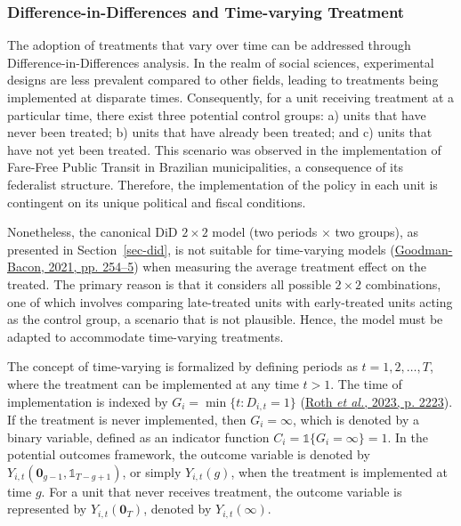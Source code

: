 \documentclass[12pt, a4paper, twoside]{article}
\numberwithin{equation}{subsection} %
\begin{document}
\hypertarget{sec-did-time-varying}{%
\subsubsection{Difference-in-Differences and Time-varying
Treatment}\label{sec-did-time-varying}}

The adoption of treatments that vary over time can be addressed through
Difference-in-Differences analysis. In the realm of social sciences,
experimental designs are less prevalent compared to other fields,
leading to treatments being implemented at disparate times.
Consequently, for a unit receiving treatment at a particular time, there
exist three potential control groups: a) units that have never been
treated; b) units that have already been treated; and c) units that have
not yet been treated. This scenario was observed in the implementation
of Fare-Free Public Transit in Brazilian municipalities, a consequence
of its federalist structure. Therefore, the implementation of the policy
in each unit is contingent on its unique political and fiscal
conditions.

Nonetheless, the canonical DiD \(2 \times 2\) model (two periods
\(\times\) two groups), as presented in Section~\ref{sec-did}, is not
suitable for time-varying models
(\protect\hyperlink{ref-Goodman-Bacon-2021-DiD}{Goodman-Bacon, 2021, pp.
254--5}) when measuring the average treatment effect on the treated. The
primary reason is that it considers all possible \(2 \times 2\)
combinations, one of which involves comparing late-treated units with
early-treated units acting as the control group, a scenario that is not
plausible. Hence, the model must be adapted to accommodate time-varying
treatments.

The concept of time-varying is formalized by defining periods as
\(t = 1, 2, \dots, T\), where the treatment can be implemented at any
time \(t > 1\). The time of implementation is indexed by
\(G_i = \min\{t: D_{i,t} = 1\}\)
(\protect\hyperlink{ref-roth_whats_2023}{Roth \emph{et al.}, 2023, p.
2223}). If the treatment is never implemented, then \(G_i = \infty\),
which is denoted by a binary variable, defined as an indicator function
\(C_i = \mathds{1}\{G_i = \infty\} = 1\). In the potential outcomes
framework, the outcome variable is denoted by
\(Y_{i, t}(\boldsymbol{0}_{g-1}, \mathds{1}_{T-g+1})\), or simply
\(Y_{i, t}(g)\), when the treatment is implemented at time \(g\). For a
unit that never receives treatment, the outcome variable is represented
by \(Y_{i, t}(\boldsymbol{0}_{T})\), denoted by \(Y_{i, t}(\infty)\).
\end{document}

